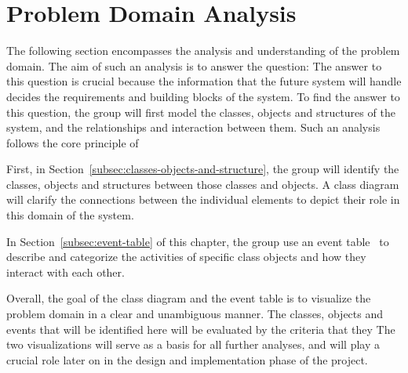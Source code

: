 \section{Problem Domain Analysis}\label{sec:problem-domain-analysis}

The following section encompasses the analysis and understanding of the problem domain.
The aim of such an analysis is to answer the question:
The answer to this question is crucial because the information that the future system will handle decides the
requirements and building blocks of the system.
To find the answer to this question, the group will first model the classes, objects and structures of the system, and the
relationships and interaction between them.
Such an analysis follows the core principle of

First, in Section~\ref{subsec:classes-objects-and-structure}, the group will identify the classes, objects and
structures between those classes and objects.
A class diagram will clarify the connections between the individual elements to depict their role in this domain of the
system.

In Section~\ref{subsec:event-table} of this chapter, the group use an event table~\cite[52]{mathiassen2018} to describe
and categorize the activities of specific class objects and how they interact with each other.

Overall, the goal of the class diagram and the event table is to visualize the problem domain in a clear and unambiguous
manner.
The classes, objects and events that will be identified here will be evaluated by the criteria that they
The two visualizations will serve as a basis for all further analyses, and will play a crucial role later on in the
design and implementation phase of the project.



